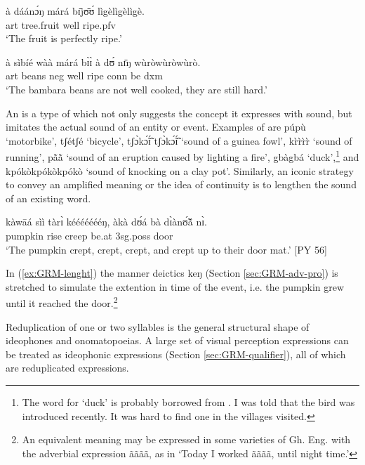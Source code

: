 \begin{exe}
\begin{exe}
\begin{exe}
\begin{exe}
\begin{exe}
\begin{exe}
\begin{exe}
\begin{exe}
\begin{exe}
\begin{exe}
\begin{exe}
\begin{exe}
   \ex\label{ex:GRM-ideo-}
\gll à dáánɔ́ŋ márá bɪ̄jʊ̄ʊ́ lìgèlìgèlìgè.\\
{\sc art} tree.fruit well ripe.{\sc pfv}  {\ideo}\\
  \glt `The fruit is perfectly ripe.'
  
  
  \ex\label{ex:GRM-ideo-1}
\gll à sìbíé wàà márá bɪ̀ɪ̀ à dʊ́ nɪ̄ŋ wùròwùròwùrò.\\
{\sc art} beans  {\sc neg} well ripe {\sc conn} be   {\sc dxm} {\ideo}\\
  \glt `The bambara beans are not well cooked, they are still hard.'
  

\z 
 \z

An  is a type of  which not only suggests the concept   it expresses with sound, but imitates  the actual sound of an entity or event.  Examples of  are {\sls púpù} `motorbike', {\sls tʃétʃé} `bicycle', {\sls tʃɔ̀kɔ̃́ɪ̃́ tʃɔ̀kɔ̃́ɪ̃́} `sound of a guinea fowl',  {\sls kr̀r̀r̀r̀} `sound of running',  {\sls pã̀ã̀} `sound of an eruption caused by lighting a fire',  {\sls gbàgbá}  `duck',\footnote{The word for `duck' is probably borrowed from . I was told that the bird was introduced recently. It was hard to find one in the villages visited.}   and {\sls kpókòkpókòkpókò} `sound of knocking on a clay pot'. Similarly, an iconic strategy to convey an amplified meaning or the idea of continuity is to lengthen the sound of an existing word. 


 \ea\label{ex:GRM-lenght}
   \gll  kàwāá sìì tàrɪ̀ kéééééééŋ, àkà dʊ́á  bà dɪ̀ànʊ̃́ã́ nɪ̀.\\
pumpkin rise {creep} {\dxm} {\conn} {be.at} {\sc 3sg.poss} door {\postp}\\
\glt `The pumpkin crept, crept, crept, and crept up to their door mat.' [PY 56]
\z



In (\ref{ex:GRM-lenght}) the manner deictics {\sls keŋ} (Section \ref{sec:GRM-adv-pro}) is stretched to simulate the extention in time of the event, i.e. the pumpkin grew until it reached the door.\footnote{An equivalent meaning may be expressed in some varieties of Gh. Eng.  with the adverbial expression  {\sls ãããã}, as in `Today I worked  {\sls ãããã}, until night time.'}

Reduplication of one or two syllables is the general structural shape of ideophones and onomatopoeias. A large set of visual perception expressions can be treated as ideophonic expressions (Section \ref{sec:GRM-qualifier}), all of which are reduplicated expressions.  



\end{exe}
\end{exe}
\end{exe}
\end{exe}
\end{exe}
\end{exe}
\end{exe}
\end{exe}
\end{exe}
\end{exe}
\end{exe}
\end{exe}
